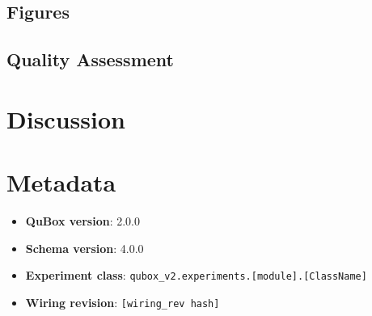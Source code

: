 \documentclass[11pt]{article}
\begin{document}
\subsection{Figures}


\subsection{Quality Assessment}


\section{Discussion}


\section{Metadata}

\begin{itemize}
    \item \textbf{QuBox version}: 2.0.0
    \item \textbf{Schema version}: 4.0.0
    \item \textbf{Experiment class}: \texttt{qubox\_v2.experiments.[module].[ClassName]}
    \item \textbf{Wiring revision}: \texttt{[wiring\_rev hash]}
\end{itemize}
\end{document}
